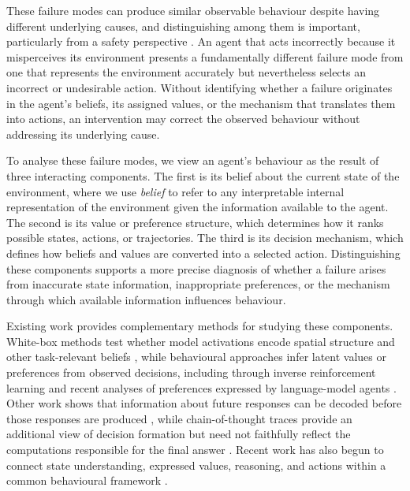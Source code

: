 \documentclass{article}
\begin{document}
These failure modes can produce similar observable behaviour despite having different underlying causes, and distinguishing among them is important, particularly from a safety perspective \cite{amodei2016concrete}. An agent that acts incorrectly because it misperceives its environment presents a fundamentally different failure mode from one that represents the environment accurately but nevertheless selects an incorrect or undesirable action. Without identifying whether a failure originates in the agent's beliefs, its assigned values, or the mechanism that translates them into actions, an intervention may correct the observed behaviour without addressing its underlying cause.

To analyse these failure modes, we view an agent's behaviour as the result of three interacting components. The first is its belief about the current state of the environment, where we use \emph{belief} to refer to any interpretable internal representation of the environment given the information available to the agent. The second is its value or preference structure, which determines how it ranks possible states, actions, or trajectories. The third is its decision mechanism, which defines how beliefs and values are converted into a selected action. Distinguishing these components supports a more precise diagnosis of whether a failure arises from inaccurate state information, inappropriate preferences, or the mechanism through which available information influences behaviour.

Existing work provides complementary methods for studying these components. White-box methods test whether model activations encode spatial structure and other task-relevant beliefs \cite{li2022emergent,nanda2023emergent,gurnee2024language,arghal2026behavioural}, while behavioural approaches infer latent values or preferences from observed decisions, including through inverse reinforcement learning \cite{ziebart2008maximum,holgado2026learning} and recent analyses of preferences expressed by language-model agents \cite{khan2026agents,lu2025aligning}. Other work shows that information about future responses can be decoded before those responses are produced \cite{belrose2023eliciting,pal2023future,dong2025emergent}, while chain-of-thought traces provide an additional view of decision formation but need not faithfully reflect the computations responsible for the final answer \cite{turpin2023language,lanham2023measuring,gao2024aligning}. Recent work has also begun to connect state understanding, expressed values, reasoning, and actions within a common behavioural framework \cite{leng2026suva}.
\end{document}
